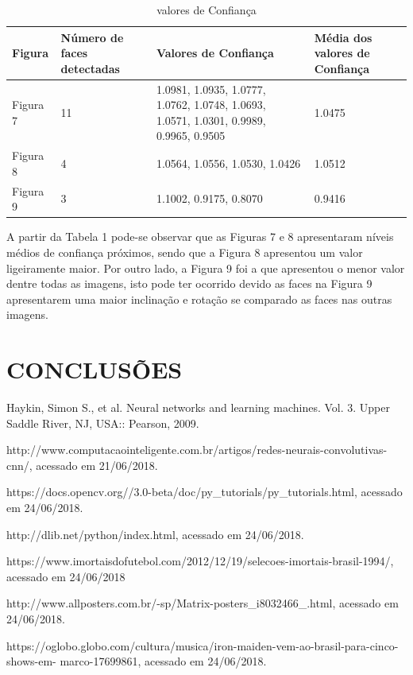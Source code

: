 \documentclass[conference]{IEEEtran}
\begin{document}
		\begin{table}[h!b]
		\caption{valores de Confiança}
		\label{table}
		\setlength{\tabcolsep}{4pt}
		\begin{tabular}{|p{30pt}|p{50pt}|p{90pt}|p{50pt}|}
			\hline
				Figura & Número de faces detectadas & Valores de Confiança & Média dos valores de Confiança\\
			\hline
				Figura 7 & 11 & 1.0981, 1.0935, 1.0777, 1.0762, 1.0748, 1.0693, 1.0571, 1.0301, 0.9989, 0.9965, 0.9505 				& 1.0475 \\
			\hline
				Figura 8 & 4 & 1.0564, 1.0556, 1.0530, 1.0426 & 1.0512\\ 
			\hline
				Figura 9 & 3 & 1.1002, 0.9175, 0.8070 & 0.9416\\ 
			\hline
		\end{tabular}
		\label{tab1}
		\end{table}        
          
          A partir da Tabela 1 pode-se observar que as Figuras 7 e 8 apresentaram níveis médios de confiança próximos, sendo que a Figura 8 apresentou um valor ligeiramente maior. Por outro lado, a Figura 9 foi a que apresentou o menor valor dentre todas as imagens, isto pode ter ocorrido devido as faces na Figura 9 apresentarem uma maior inclinação e rotação se comparado as faces nas outras imagens.
	
	\section{CONCLUSÕES}
         
      
         
	  \begin{thebibliography}{00}
	  
		 Haykin, Simon S., et al. Neural networks and learning machines. Vol. 3. Upper Saddle River, NJ, 			USA:: Pearson, 2009.
		
		 http://www.computacaointeligente.com.br/artigos/redes-neurais-convolutivas-cnn/, acessado em 		        21/06/2018.
		
		 https://docs.opencv.org//3.0-beta/doc/py\_tutorials/py\_tutorials.html, acessado em 24/06/2018.
		
		 http://dlib.net/python/index.html, acessado em 24/06/2018.
		
		 https://www.imortaisdofutebol.com/2012/12/19/selecoes-imortais-brasil-1994/, acessado em                                                                   		24/06/2018
		
		 http://www.allposters.com.br/-sp/Matrix-posters\_i8032466\_.html, acessado em 24/06/2018.

		 https://oglobo.globo.com/cultura/musica/iron-maiden-vem-ao-brasil-para-cinco-shows-em-						marco-17699861, acessado em 24/06/2018.
		
	  \end{thebibliography}
\end{document}
